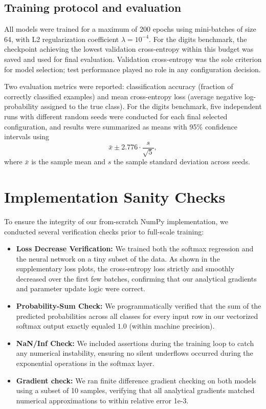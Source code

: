 \documentclass[11pt]{article}
\begin{document}
\subsection{Training protocol and evaluation}

All models were trained for a maximum of 200 epochs using mini-batches of size 64, with
L2 regularization coefficient $\lambda = 10^{-4}$. For the digits benchmark, the
checkpoint achieving the lowest validation cross-entropy within this budget was saved
and used for final evaluation. Validation cross-entropy was the sole criterion for
model selection; test performance played no role in any configuration decision.

Two evaluation metrics were reported: classification accuracy (fraction of correctly
classified examples) and mean cross-entropy loss (average negative log-probability
assigned to the true class). For the digits benchmark, five independent runs with
different random seeds were conducted for each final selected configuration, and results
were summarized as means with 95\% confidence intervals using
\begin{equation}
    \bar{x} \pm 2.776 \cdot \frac{s}{\sqrt{5}},
\end{equation}
where $\bar{x}$ is the sample mean and $s$ the sample standard deviation across seeds.

\section{Implementation Sanity Checks}

To ensure the integrity of our from-scratch NumPy implementation, we conducted several verification checks prior to full-scale training:\begin{itemize}\item \textbf{Loss Decrease Verification:} We trained both the softmax regression and the neural network on a tiny subset of the data. As shown in the supplementary loss plots, the cross-entropy loss strictly and smoothly decreased over the first few batches, confirming that our analytical gradients and parameter update logic were correct.\item \textbf{Probability-Sum Check:} We programmatically verified that the sum of the predicted probabilities across all classes for every input row in our vectorized softmax output exactly equaled $1.0$ (within machine precision).\item \textbf{NaN/Inf Check:} We included assertions during the training loop to catch any numerical instability, ensuring no silent underflows occurred during the exponential operations in the softmax layer. \item \textbf{Gradient check:} We ran  finite difference gradient checking on both models using a subset of 10 samples, verifying that all analytical gradients matched numerical approximations to within relative error 1e-3. \end{itemize}
\end{document}
